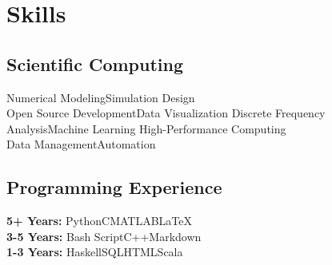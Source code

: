 \documentclass[letterpaper]{deedy-resume} %
\begin{document}
\begin{minipage}[t]{0.32\textwidth}
\section{Skills}

%

\subsection{Scientific Computing}
Numerical Modeling\textbullet{}Simulation Design\\
Open Source Development\textbullet{}Data Visualization
Discrete Frequency Analysis\textbullet{}Machine Learning
High-Performance Computing\\
Data Management\textbullet{}Automation

\sectionspace

\subsection{Programming Experience}
\textbf{5+ Years:}	Python\textbullet{}C\textbullet{}MATLAB\textbullet{}\LaTeX\\
\textbf{3-5 Years:}	Bash Script\textbullet{}C++\textbullet{}Markdown\\
\textbf{1-3 Years:}	Haskell\textbullet{}SQL\textbullet{}HTML\textbullet{}Scala


\end{minipage}
\end{document}
